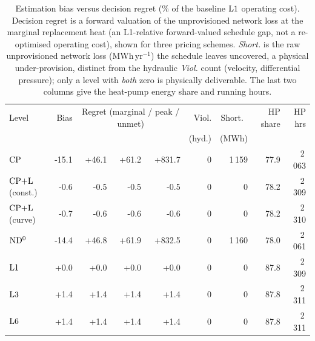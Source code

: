 \begin{table}[t]
\centering
\caption{Estimation bias versus decision regret (\% of the baseline $\mathrm{L1}$ operating cost).
Decision regret is a forward valuation of the unprovisioned network loss at the marginal
replacement heat (an L1-relative forward-valued schedule gap, not a re-optimised operating
cost), shown for three pricing schemes. \emph{Short.} is the raw unprovisioned network loss
(MWh\,yr$^{-1}$) the schedule leaves uncovered, a physical under-provision, distinct from the
hydraulic \emph{Viol.} count (velocity, differential pressure); only a level with \emph{both}
zero is physically deliverable. The last two columns give the heat-pump energy share and
running hours.}
\label{tab:regret}
\begin{tabular}{lrrrrrrrr}
\hline
Level & Bias & \multicolumn{3}{c}{Regret (marginal / peak / unmet)} & Viol. & Short.\ & HP share & HP hrs \\
 & & & & & (hyd.) & (MWh) & & \\
\hline
$\mathrm{CP}$ & -15.1 & +46.1 & +61.2 & +831.7 & 0 & 1\,159 & 77.9 & 2\,063 \\
$\mathrm{CP{+}L}$ (const.) & -0.6 & -0.5 & -0.5 & -0.5 & 0 & 0 & 78.2 & 2\,309 \\
$\mathrm{CP{+}L}$ (curve) & -0.7 & -0.6 & -0.6 & -0.6 & 0 & 0 & 78.2 & 2\,310 \\
$\mathrm{ND^{0}}$ & -14.4 & +46.8 & +61.9 & +832.5 & 0 & 1\,160 & 78.0 & 2\,061 \\
$\mathrm{L1}$ & +0.0 & +0.0 & +0.0 & +0.0 & 0 & 0 & 87.8 & 2\,309 \\
$\mathrm{L3}$ & +1.4 & +1.4 & +1.4 & +1.4 & 0 & 0 & 87.8 & 2\,311 \\
$\mathrm{L6}$ & +1.4 & +1.4 & +1.4 & +1.4 & 0 & 0 & 87.8 & 2\,311 \\
\hline
\end{tabular}
\end{table}
